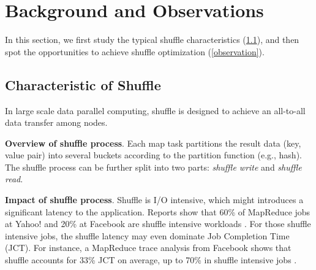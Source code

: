\section{Background and Observations}

In this section, we first study the typical shuffle characteristics (\ref{shuffle pattern}), and then spot the opportunities to achieve shuffle optimization (\ref{observation}).
\subsection{Characteristic of Shuffle} \label{shuffle pattern}

In large scale data parallel computing, shuffle is designed to achieve an all-to-all data transfer among nodes. 

\textbf{Overview of shuffle process}. 
Each map task partitions the result data (key, value pair) into several buckets according to the partition function (e.g., hash). 
The shuffle process can be further split into two parts: \textit{shuffle write} and \textit{shuffle read}. 

\textbf{Impact of shuffle process}. Shuffle is I/O intensive, which might introduces a significant latency to the application. 
Reports show that 60\% of MapReduce jobs at Yahoo! and 20\% at Facebook are shuffle intensive workloads \cite{shufflewatcher}. 
For those shuffle intensive jobs, the shuffle latency may even dominate Job Completion Time (JCT).
For instance, a MapReduce trace analysis from Facebook shows that shuffle accounts for 33\% JCT on average, up to 70\% in shuffle intensive jobs \cite{managing}.

